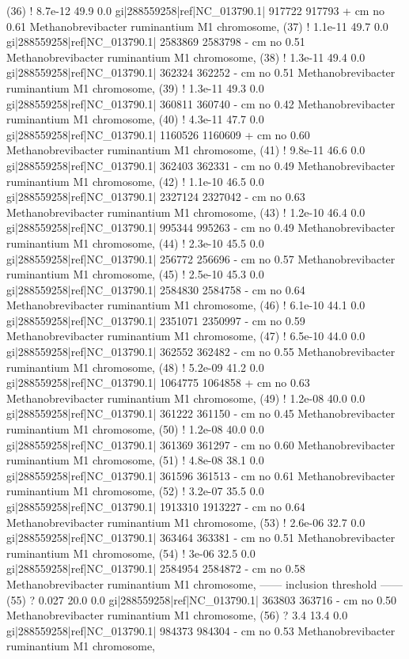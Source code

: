 \begin{sreoutput}
 (36) !   8.7e-12   49.9   0.0  gi|288559258|ref|NC_013790.1|  917722  917793 +  cm    no 0.61  Methanobrevibacter ruminantium M1 chromosome, 
 (37) !   1.1e-11   49.7   0.0  gi|288559258|ref|NC_013790.1| 2583869 2583798 -  cm    no 0.51  Methanobrevibacter ruminantium M1 chromosome, 
 (38) !   1.3e-11   49.4   0.0  gi|288559258|ref|NC_013790.1|  362324  362252 -  cm    no 0.51  Methanobrevibacter ruminantium M1 chromosome, 
 (39) !   1.3e-11   49.3   0.0  gi|288559258|ref|NC_013790.1|  360811  360740 -  cm    no 0.42  Methanobrevibacter ruminantium M1 chromosome, 
 (40) !   4.3e-11   47.7   0.0  gi|288559258|ref|NC_013790.1| 1160526 1160609 +  cm    no 0.60  Methanobrevibacter ruminantium M1 chromosome, 
 (41) !   9.8e-11   46.6   0.0  gi|288559258|ref|NC_013790.1|  362403  362331 -  cm    no 0.49  Methanobrevibacter ruminantium M1 chromosome, 
 (42) !   1.1e-10   46.5   0.0  gi|288559258|ref|NC_013790.1| 2327124 2327042 -  cm    no 0.63  Methanobrevibacter ruminantium M1 chromosome, 
 (43) !   1.2e-10   46.4   0.0  gi|288559258|ref|NC_013790.1|  995344  995263 -  cm    no 0.49  Methanobrevibacter ruminantium M1 chromosome, 
 (44) !   2.3e-10   45.5   0.0  gi|288559258|ref|NC_013790.1|  256772  256696 -  cm    no 0.57  Methanobrevibacter ruminantium M1 chromosome, 
 (45) !   2.5e-10   45.3   0.0  gi|288559258|ref|NC_013790.1| 2584830 2584758 -  cm    no 0.64  Methanobrevibacter ruminantium M1 chromosome, 
 (46) !   6.1e-10   44.1   0.0  gi|288559258|ref|NC_013790.1| 2351071 2350997 -  cm    no 0.59  Methanobrevibacter ruminantium M1 chromosome, 
 (47) !   6.5e-10   44.0   0.0  gi|288559258|ref|NC_013790.1|  362552  362482 -  cm    no 0.55  Methanobrevibacter ruminantium M1 chromosome, 
 (48) !   5.2e-09   41.2   0.0  gi|288559258|ref|NC_013790.1| 1064775 1064858 +  cm    no 0.63  Methanobrevibacter ruminantium M1 chromosome, 
 (49) !   1.2e-08   40.0   0.0  gi|288559258|ref|NC_013790.1|  361222  361150 -  cm    no 0.45  Methanobrevibacter ruminantium M1 chromosome, 
 (50) !   1.2e-08   40.0   0.0  gi|288559258|ref|NC_013790.1|  361369  361297 -  cm    no 0.60  Methanobrevibacter ruminantium M1 chromosome, 
 (51) !   4.8e-08   38.1   0.0  gi|288559258|ref|NC_013790.1|  361596  361513 -  cm    no 0.61  Methanobrevibacter ruminantium M1 chromosome, 
 (52) !   3.2e-07   35.5   0.0  gi|288559258|ref|NC_013790.1| 1913310 1913227 -  cm    no 0.64  Methanobrevibacter ruminantium M1 chromosome, 
 (53) !   2.6e-06   32.7   0.0  gi|288559258|ref|NC_013790.1|  363464  363381 -  cm    no 0.51  Methanobrevibacter ruminantium M1 chromosome, 
 (54) !     3e-06   32.5   0.0  gi|288559258|ref|NC_013790.1| 2584954 2584872 -  cm    no 0.58  Methanobrevibacter ruminantium M1 chromosome, 
 ------ inclusion threshold ------
 (55) ?     0.027   20.0   0.0  gi|288559258|ref|NC_013790.1|  363803  363716 -  cm    no 0.50  Methanobrevibacter ruminantium M1 chromosome, 
 (56) ?       3.4   13.4   0.0  gi|288559258|ref|NC_013790.1|  984373  984304 -  cm    no 0.53  Methanobrevibacter ruminantium M1 chromosome, 
\end{sreoutput}

